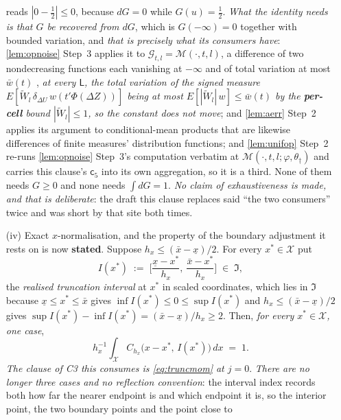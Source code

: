\begin{lemma}
\begin{enumerate}
reads $|0-\tfrac12|\le0$, because $dG=0$ while $G(u)=\tfrac12$. \emph{What the identity needs is that
$G$ be recovered from $dG$}, which is
$G(-\infty)=0$ together with bounded variation, and \emph{that is precisely what its consumers have}:
\cref{lem:opnoise} Step~3 applies it to $\mathcal G_{t,l}=\mathcal M(\cdot,t,l)$, a difference of two
nondecreasing functions each vanishing at $-\infty$ and of total variation at most $\bar w(t)$
, \emph{at every $\mathsf L$, the total variation of the signed measure
$E[\widetilde W_l\,\delta_{\Delta U}\,w(t'\Phi(\Delta Z))]$ being at most
$E[|\widetilde W_l|\,w]\le\bar w(t)$ by the \textbf{per-cell} bound $|\widetilde W_l|\le1$, so the
constant does not move}; and
\cref{lem:aerr} Step~2 applies its argument to conditional-mean products that are likewise differences
of finite measures' distribution functions; and \cref{lem:unifop} Step~2 re-runs
\cref{lem:opnoise} Step~3's computation verbatim at
$\mathcal M(\cdot,t,l;\varphi,\theta_\dagger)$ and carries this clause's $\mathsf c_5$ into its own
aggregation, so it is a third. None of them needs $G\ge0$ and none needs $\int dG=1$. \emph{No claim
of exhaustiveness is made, and that is deliberate}: the draft this clause replaces said ``the two
consumers'' twice and was short by that site both times.
\item[(iv)] Exact $x$-normalisation, and the property of the boundary adjustment it rests on is
now \textbf{stated}. Suppose $h_x\le(\bar x-\underline x)/2$. For every $x^\ast\in\mathcal X$ put
\begin{equation}\label{eq:ivalx}
I(x^\ast)\;:=\;\Big[\frac{\underline x-x^\ast}{h_x},\ \frac{\bar x-x^\ast}{h_x}\Big]\;\in\;\mathfrak I ,
\end{equation}
the \emph{realised truncation interval} at $x^\ast$ in scaled coordinates, which lies in $\mathfrak I$
because $\underline x\le x^\ast\le\bar x$ gives $\inf I(x^\ast)\le0\le\sup I(x^\ast)$ and
$h_x\le(\bar x-\underline x)/2$ gives $\sup I(x^\ast)-\inf I(x^\ast)=(\bar x-\underline x)/h_x\ge2$.
Then, \emph{for every $x^\ast\in\mathcal X$, one case},
\[
h_x^{-1}\!\int_{\mathcal X}C_{h_x}\big(x-x^\ast,\,I(x^\ast)\big)\,dx\;=\;1 .
\]
\emph{The clause of C3 this consumes is \eqref{eq:truncmom} at $j=0$}. \emph{There are no longer three
cases and no reflection convention}: the interval index records both how far the nearer endpoint is
and which endpoint it is, so the interior point, the two boundary points and the point close to

\end{enumerate}
\end{lemma}
